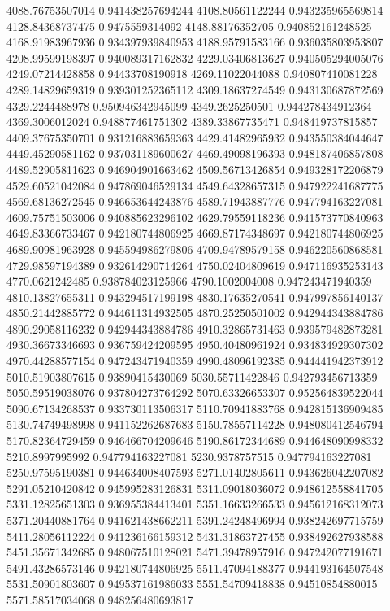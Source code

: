 {4088.76753507014 0.941438257694244
4108.80561122244 0.943235965569814
4128.84368737475 0.9475559314092
4148.88176352705 0.940852161248525
4168.91983967936 0.934397939840953
4188.95791583166 0.936035803953807
4208.99599198397 0.940089317162832
4229.03406813627 0.940505294005076
4249.07214428858 0.94433708190918
4269.11022044088 0.940807410081228
4289.14829659319 0.939301252365112
4309.18637274549 0.943130687872569
4329.2244488978 0.950946342945099
4349.2625250501 0.944278434912364
4369.3006012024 0.948877461751302
4389.33867735471 0.948419737815857
4409.37675350701 0.931216883659363
4429.41482965932 0.943550384044647
4449.45290581162 0.937031189600627
4469.49098196393 0.948187406857808
4489.52905811623 0.946904901663462
4509.56713426854 0.949328172206879
4529.60521042084 0.947869046529134
4549.64328657315 0.947922241687775
4569.68136272545 0.946653644243876
4589.71943887776 0.947794163227081
4609.75751503006 0.940885623296102
4629.79559118236 0.941573770840963
4649.83366733467 0.942180744806925
4669.87174348697 0.942180744806925
4689.90981963928 0.945594986279806
4709.94789579158 0.946220560868581
4729.98597194389 0.932614290714264
4750.02404809619 0.947116935253143
4770.0621242485 0.938784023125966
4790.1002004008 0.947243471940359
4810.13827655311 0.943294517199198
4830.17635270541 0.947997856140137
4850.21442885772 0.944611314932505
4870.25250501002 0.942944343884786
4890.29058116232 0.942944343884786
4910.32865731463 0.939579482873281
4930.36673346693 0.936759424209595
4950.40480961924 0.934834929307302
4970.44288577154 0.947243471940359
4990.48096192385 0.944441942373912
5010.51903807615 0.93890415430069
5030.55711422846 0.942793456713359
5050.59519038076 0.937804273764292
5070.63326653307 0.952564839522044
5090.67134268537 0.933730113506317
5110.70941883768 0.942815136909485
5130.74749498998 0.941152262687683
5150.78557114228 0.948080412546794
5170.82364729459 0.946466704209646
5190.86172344689 0.944648090998332
5210.8997995992 0.947794163227081
5230.9378757515 0.947794163227081
5250.97595190381 0.944634008407593
5271.01402805611 0.943626042207082
5291.05210420842 0.945995283126831
5311.09018036072 0.948612558841705
5331.12825651303 0.936955384413401
5351.16633266533 0.945612168312073
5371.20440881764 0.941621438662211
5391.24248496994 0.938242697715759
5411.28056112224 0.941236166159312
5431.31863727455 0.938492627938588
5451.35671342685 0.948067510128021
5471.39478957916 0.947242077191671
5491.43286573146 0.942180744806925
5511.47094188377 0.944193164507548
5531.50901803607 0.949537161986033
5551.54709418838 0.94510854880015
5571.58517034068 0.948256480693817
}
